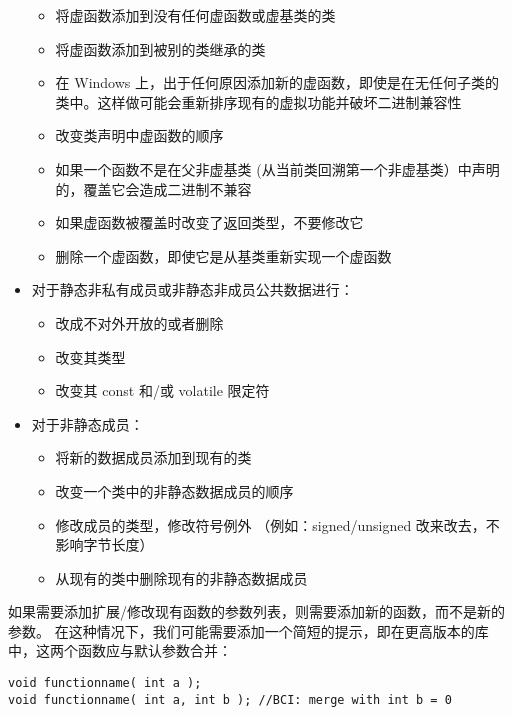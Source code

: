 \begin{itemize}
  \begin{itemize}
  
  \item
    将虚函数添加到没有任何虚函数或虚基类的类
  \item
    将虚函数添加到被别的类继承的类
  \item
    在 Windows
    上，出于任何原因添加新的虚函数，即使是在无任何子类的类中。这样做可能会重新排序现有的虚拟功能并破坏二进制兼容性
  \item
    改变类声明中虚函数的顺序
  \item
    如果一个函数不是在父非虚基类
    (从当前类回溯第一个非虚基类）中声明的，覆盖它会造成二进制不兼容
  \item
    如果虚函数被覆盖时改变了返回类型，不要修改它
  \item
    删除一个虚函数，即使它是从基类重新实现一个虚函数
  \end{itemize}
\item
  对于静态非私有成员或非静态非成员公共数据进行：

  \begin{itemize}
  
  \item
    改成不对外开放的或者删除
  \item
    改变其类型
  \item
    改变其 const 和/或 volatile 限定符
  \end{itemize}
\item
  对于非静态成员：

  \begin{itemize}
  
  \item
    将新的数据成员添加到现有的类
  \item
    改变一个类中的非静态数据成员的顺序
  \item
    修改成员的类型，修改符号例外 （例如：signed/unsigned
    改来改去，不影响字节长度）
  \item
    从现有的类中删除现有的非静态数据成员
  \end{itemize}
\end{itemize}

如果需要添加扩展/修改现有函数的参数列表，则需要添加新的函数，而不是新的参数。
在这种情况下，我们可能需要添加一个简短的提示，即在更高版本的库中，这两个函数应与默认参数合并：

\begin{lstlisting}
void functionname( int a );
void functionname( int a, int b ); //BCI: merge with int b = 0
\end{lstlisting}

